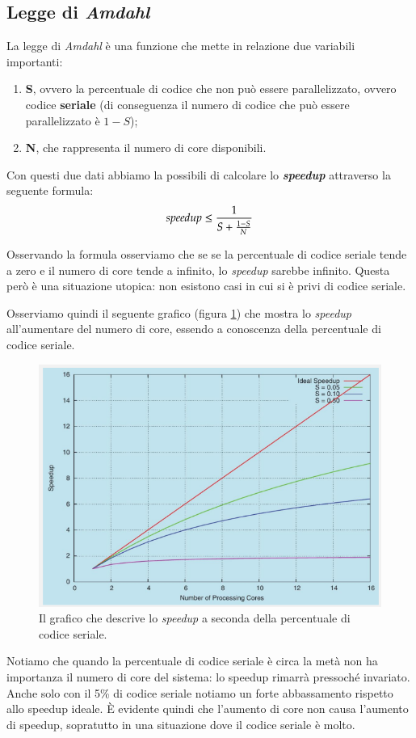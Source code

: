 \subsection{Legge di \textit{Amdahl}}
La legge di \textit{Amdahl} è una funzione che mette in relazione due variabili importanti:
\vspace{-5px}
\begin{enumerate}
\setlength{\itemsep}{-.15 em}
    \item \textbf{S}, ovvero la percentuale di codice che non può essere parallelizzato, ovvero codice \textbf{seriale} (di conseguenza il numero di codice che può essere parallelizzato è $1 - S$);
    \item \textbf{N}, che rappresenta il numero di core disponibili. 
\end{enumerate}

\noindent Con questi due dati abbiamo la possibili di calcolare lo \textit{\textbf{speedup}} attraverso la seguente formula:
\begin{equation*}
    \text{\textit{speedup}} \leq \frac{1}{S + \frac{1 - S}{N}}
\end{equation*}

\noindent Osservando la formula osserviamo che se se la percentuale di codice seriale tende a zero e il numero di core tende a infinito, lo \textit{speedup} sarebbe infinito. Questa però è una situazione utopica: non esistono casi in cui si è privi di codice seriale.

Osserviamo quindi il seguente grafico (figura \ref{fig:speedup}) che mostra lo \textit{speedup} all'aumentare del numero di core, essendo a conoscenza della percentuale di codice seriale.
\begin{figure}[!h]
    \centering
    \includegraphics[width=.6\textwidth]{../res/imgs/threads/speedup.png}
    \caption{Il grafico che descrive lo \textit{speedup} a seconda della percentuale di codice seriale.}
    \label{fig:speedup}
\end{figure}
Notiamo che quando la percentuale di codice seriale è circa la metà non ha importanza il numero di core del sistema: lo speedup rimarrà pressoché invariato. Anche solo con il 5\% di codice seriale notiamo un forte abbassamento rispetto allo speedup ideale. È evidente quindi che l'aumento di core non causa l'aumento di speedup, sopratutto in una situazione dove il codice seriale è molto. 
% 
